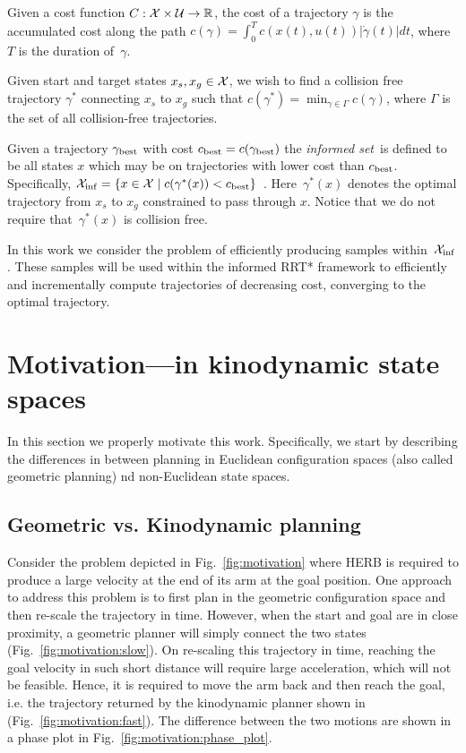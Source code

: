 \documentclass[letterpaper, 10 pt, conference]{ieeeconf}  %
\begin{document}
Given a cost function $C : \mathcal{X} \times \mathcal{U} \rightarrow \mathbb{R}$, the cost of a trajectory $ \gamma $ is the accumulated cost along the path
$c(\gamma) = \int_0^{T} c( x(t), u(t) ) |\dot{\gamma}(t)|dt$, 
where $T$ is the duration of~$\gamma$.

Given start and target states $x_s, x_g \in \mathcal{X}$, we wish to find a collision free trajectory $\gamma^*$ connecting $x_s$ to $x_g$ such that 
$c(\gamma^*) = \min_{\gamma \in \Gamma} c(\gamma)$, where $\Gamma$ is the set of all collision-free trajectories.

Given a trajectory $\gamma_{\rm best}$ with cost $c_{\rm best} = c(\gamma_{\rm best})$ the \emph{informed set}~\Cinf is defined to be all states $x$  which may be on trajectories with lower cost than $c_{\rm best}$.
Specifically,
$
\mathcal{X}_{\rm {inf}} = \{ x \in \mathcal{X} \mid  
		c ( \gamma^*(x) ) < c_{\rm best} \} $~\cite{GSB14}.
Here~$ \gamma^*(x) $ denotes the optimal trajectory  from $ x_s $ to $ x_g $ constrained to pass through $ x $.
Notice that we do not require that~$ \gamma^*(x) $ is collision free.

In this work we consider the problem of efficiently producing samples within~$\mathcal{X}_{\rm {inf}}$.
These samples will be used within the informed RRT* framework to efficiently and incrementally compute trajectories of decreasing cost, converging to the optimal trajectory.


\section{Motivation---\Cinf in kinodynamic state spaces}
\label{sec:mtdi}

In this section we properly motivate this work.
Specifically, we start by describing the differences in between planning in Euclidean configuration spaces (also called geometric planning) nd non-Euclidean  state spaces.


\subsection{Geometric vs. Kinodynamic planning}
Consider the problem depicted in Fig.~\ref{fig:motivation} where HERB is required to produce a large velocity at the end of its arm at the goal position.
One approach to address this problem is to first plan in the geometric configuration space and then re-scale the trajectory in time.
However, when the start and goal are in close proximity, a geometric planner will simply connect the two states (Fig.~\ref{fig:motivation:slow}).
On re-scaling this trajectory in time, reaching the goal velocity in such short distance will require large acceleration, which will not be feasible.
Hence, it is required to move the arm back and then reach the goal, i.e. the trajectory returned by the kinodynamic planner shown in (Fig.~\ref{fig:motivation:fast}).
The difference between the two motions are shown in a phase plot in Fig.~\ref{fig:motivation:phase_plot}.
\end{document}
